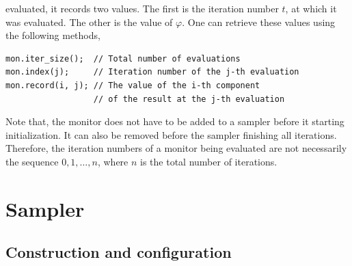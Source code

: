 evaluated, it records two values. The first is the iteration number $t$, at
which it was evaluated. The other is the value of $\varphi$. One can retrieve
these values using the following methods,
\begin{Verbatim}
mon.iter_size();  // Total number of evaluations
mon.index(j);     // Iteration number of the j-th evaluation
mon.record(i, j); // The value of the i-th component
                  // of the result at the j-th evaluation
\end{Verbatim}
Note that, the monitor does not have to be added to a sampler before it
starting initialization. It can also be removed before the sampler finishing
all iterations. Therefore, the iteration numbers of a monitor being evaluated
are not necessarily the sequence $0,1,\dots,n$, where $n$ is the total number
of iterations.

\section{Sampler}
\label{sec:Sampler}

\subsection{Construction and configuration}
\label{sec:Construction and configuration}

